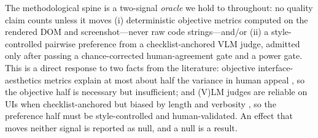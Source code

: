 The methodological spine is a two-signal \emph{oracle} we hold to throughout: no quality claim
counts unless it moves (i) deterministic objective metrics computed on the rendered DOM and
screenshot---never raw code strings---and/or (ii) a style-controlled pairwise preference from a
checklist-anchored VLM judge, admitted only after passing a chance-corrected human-agreement
gate and a power gate. This is a direct response to two facts from the literature: objective
interface-aesthetics metrics explain at most about half the variance in human appeal
\citep{miniukovich2015computation,reinecke2013predicting}, so the objective half is necessary
but insufficient; and (V)LM judges are reliable on UIs when checklist-anchored
\citep{zhang2025artifactsbench,jeon2025gfocus} but biased by length and verbosity
\citep{zheng2023mtbench}, so the preference half must be style-controlled and human-validated.
An effect that moves neither signal is reported as null, and a null is a result.

